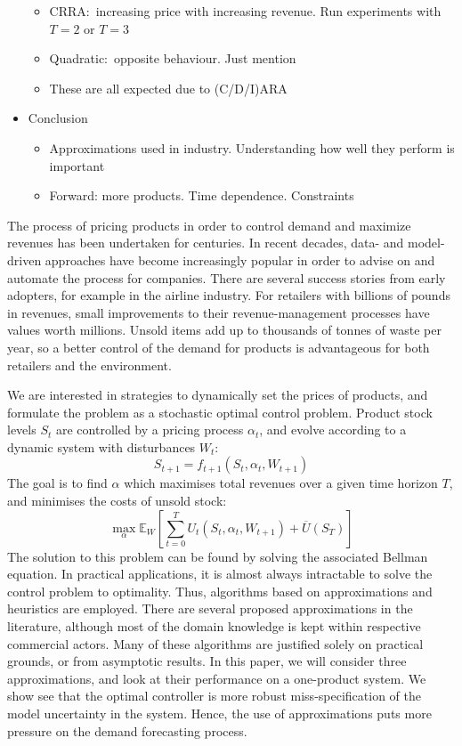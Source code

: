 \documentclass[main.tex]{subfiles}
\begin{document}
\begin{itemize}
\begin{itemize}
  \item CRRA:~increasing price with increasing revenue. Run
    experiments with $T=2$ or $T=3$
  \item Quadratic:~opposite behaviour. Just mention
  \item These are all expected due to (C/D/I)ARA
  \end{itemize}
\item Conclusion
  \begin{itemize}
  \item Approximations used in industry. Understanding how well they
    perform is important
  \item Forward: more products. Time dependence. Constraints
  \end{itemize}
\end{itemize}

The process of pricing products in order to control demand and
maximize revenues has been undertaken for centuries. In recent
decades, data- and model-driven approaches have become increasingly
popular in order to advise on and automate the process for companies.
There are several success stories from early adopters, for example in
the airline industry.
For retailers with billions of pounds in revenues, small
improvements to their revenue-management processes have values worth millions.
Unsold items add up to thousands of tonnes of waste per year, so
a better control of the demand for products is advantageous
for both retailers and the environment.

We are interested in strategies to dynamically set the prices of products, and
formulate the problem as a stochastic optimal control problem.
Product stock levels $S_t$ are controlled by a pricing process
$\alpha_t$, and evolve according to a dynamic system with disturbances
$W_t$:
\begin{equation}
S_{t+1}=f_{t+1}(S_t,\alpha_t,W_{t+1})
\end{equation}
The goal is to find $\alpha$ which maximises total revenues over a
given time horizon $T$, and
minimises the costs of unsold stock:
\begin{equation}
  \max_{\alpha}\mathbb E_W\left[ \sum_{t=0}^TU_t(S_t,\alpha_t,W_{t+1})
  + \overline{U}(S_T)\right]
\end{equation}
The solution to this problem can be found by solving the associated
Bellman equation. In practical applications, it is almost always
intractable to solve the control problem to optimality.
Thus, algorithms based on approximations and heuristics are employed.
There are several proposed approximations in the
literature, although most of the domain knowledge is kept within
respective commercial actors.
Many of these algorithms are justified solely on practical grounds, or
from asymptotic results.
In this paper, we will consider three approximations,
and look at their performance on a one-product system.
We show see that the optimal controller is more robust
miss-specification of the model uncertainty in the system.
Hence, the use of approximations puts more pressure on the
demand forecasting process.
\end{document}
